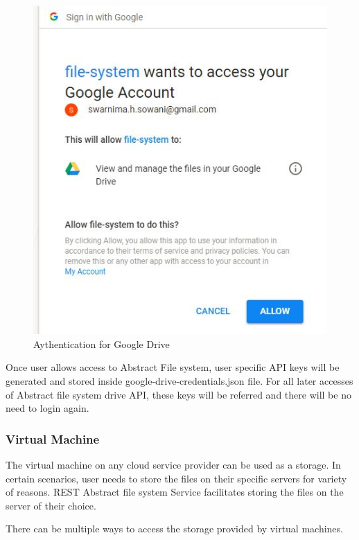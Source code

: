 \begin{figure}[!ht]
        \centering\includegraphics[width=\columnwidth]
        {image/auth.JPG}
        \caption{Aythentication for Google Drive}\label{fig:auth}
\end{figure}


Once user allows access to Abstract File system, user specific API
keys will be generated and stored inside google-drive-credentials.json
file.  For all later accesses of Abstract file system drive API, these
keys will be referred and there will be no need to login again.


\subsubsection{Virtual Machine}


The virtual machine on any cloud service provider can be used as a
storage. In certain scenarios, user needs to store the files on their
specific servers for variety of reasons. REST Abstract file system 
Service facilitates storing the files on the server of their choice.

There can be multiple ways to access the storage provided by virtual
machines.

